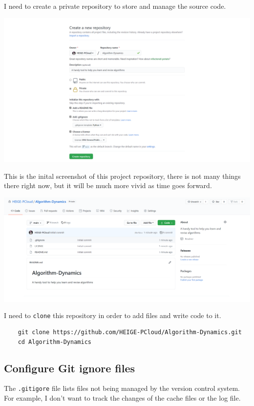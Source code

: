 \documentclass{report}
\begin{document}
I need to create a private repository to store and manage the source code.

\includegraphics[width=\linewidth]{Create-a-New-Repository}

This is the inital screenshot of this project repository, there is not many things there right now, but it will be much more vivid as time goes forward.

\includegraphics[width=\linewidth]{HEIGE-PCloud-Algorithm-Dynamics-A-handy-tool-to-help-you-learn-and-revise-algorithms}

I need to \texttt{clone} this repository in order to add files and write code to it.

\begin{verbatim}
    git clone https://github.com/HEIGE-PCloud/Algorithm-Dynamics.git
    cd Algorithm-Dynamics
\end{verbatim}

\subsection{Configure Git ignore files}

The \texttt{.gitigore} file lists files not being managed by the version control system. For example, I don't want to track the changes of the cache files or the log file.
\end{document}
